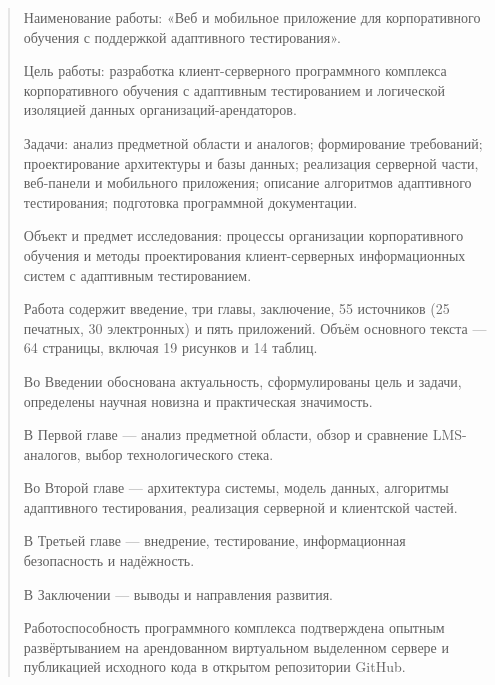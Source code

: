 \begin{abstract}
\thispagestyle{empty}

Наименование работы: «Веб и мобильное приложение для корпоративного 
обучения с поддержкой адаптивного тестирования».

Цель работы: разработка клиент-серверного программного комплекса 
корпоративного обучения с адаптивным тестированием и логической 
изоляцией данных организаций-арендаторов.

Задачи: анализ предметной области и аналогов; формирование требований; 
проектирование архитектуры и базы данных; реализация серверной части, 
веб-панели и мобильного приложения; описание алгоритмов адаптивного 
тестирования; подготовка программной документации.

Объект и предмет исследования: процессы организации корпоративного 
обучения и методы проектирования клиент-серверных информационных систем 
с адаптивным тестированием.

Работа содержит введение, три главы, заключение, 55 источников 
(25 печатных, 30 электронных) и пять приложений. Объём основного текста — 64 страницы, 
включая 19 рисунков и 14 таблиц.

Во Введении обоснована актуальность, сформулированы цель и задачи, 
определены научная новизна и практическая значимость.

В Первой главе — анализ предметной области, обзор и сравнение 
LMS-аналогов, выбор технологического стека.

Во Второй главе — архитектура системы, модель данных, алгоритмы 
адаптивного тестирования, реализация серверной и клиентской частей.

В Третьей главе — внедрение, тестирование, информационная безопасность 
и надёжность.

В Заключении — выводы и направления развития.

Работоспособность программного комплекса подтверждена опытным развёртыванием на арендованном виртуальном выделенном сервере и публикацией исходного кода в открытом репозитории GitHub.

\end{abstract}
